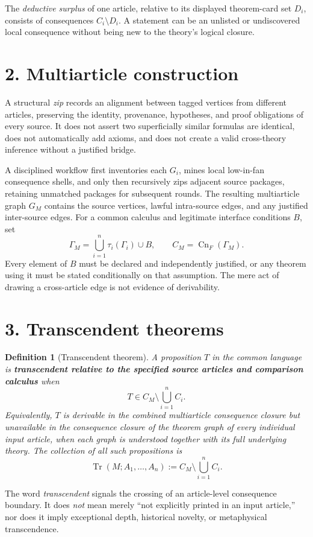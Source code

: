 \documentclass[10pt]{article}
\theoremstyle{simple}
\newtheorem{definition}{Definition}
\newcommand{\Cn}{\operatorname{Cn}}
\newcommand{\Tr}{\operatorname{Tr}}
\begin{document}
The \emph{deductive surplus} of one article, relative to its displayed theorem-card set $D_i$, consists of consequences $C_i\setminus D_i$. A statement can be an unlisted or undiscovered local consequence without being new to the theory's logical closure.

\section{2. Multiarticle construction}
A structural \emph{zip} records an alignment between tagged vertices from different articles, preserving the identity, provenance, hypotheses, and proof obligations of every source. It does not assert two superficially similar formulas are identical, does not automatically add axioms, and does not create a valid cross-theory inference without a justified bridge.

A disciplined workflow first inventories each $G_i$, mines local low-in-fan consequence shells, and only then recursively zips adjacent source packages, retaining unmatched packages for subsequent rounds. The resulting multiarticle graph $G_M$ contains the source vertices, lawful intra-source edges, and any justified inter-source edges. For a common calculus and legitimate interface conditions $B$, set
\[
 \Gamma_M=\bigcup_{i=1}^{n}\tau_i(\Gamma_i)\cup B,\qquad
 C_M=\Cn_F(\Gamma_M).
\]
Every element of $B$ must be declared and independently justified, or any theorem using it must be stated conditionally on that assumption. The mere act of drawing a cross-article edge is not evidence of derivability.

\section{3. Transcendent theorems}
\begin{definition}[Transcendent theorem]
A proposition $T$ in the common language is \textbf{transcendent relative to the specified source articles and comparison calculus} when
\[
 \boxed{\displaystyle
 T\in C_M\setminus\bigcup_{i=1}^{n} C_i.}
\]
Equivalently, $T$ is derivable in the combined multiarticle consequence closure but \emph{unavailable in the consequence closure of the theorem graph of every individual input article}, when each graph is understood together with its full underlying theory. The collection of all such propositions is
\[
 \Tr(M;A_1,\ldots,A_n):=C_M\setminus\bigcup_{i=1}^{n}C_i.
\]
\end{definition}

The word \emph{transcendent} signals the crossing of an article-level consequence boundary. It does \emph{not} mean merely ``not explicitly printed in an input article,'' nor does it imply exceptional depth, historical novelty, or metaphysical transcendence.
\end{document}
